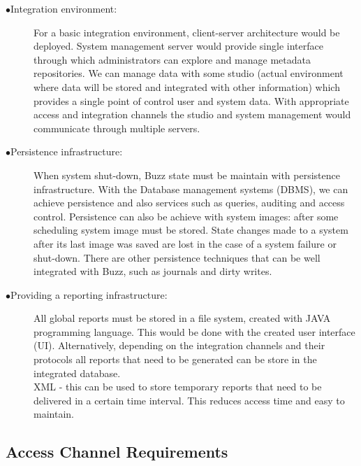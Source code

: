 \documentclass[hidelinks, 12pt]{article}
\begin{document}
\begin{description}
\item[$\bullet$Integration environment:]

For a basic integration environment, client-server architecture would be deployed. System management server would provide single interface through which administrators can explore and manage metadata repositories. We can manage data with some studio (actual environment where data will be stored and integrated with other information) which provides a single point of control user and system data. With appropriate access and integration channels the studio and system management would communicate through multiple servers.\\

\item[$\bullet$Persistence infrastructure:]

When system shut-down, Buzz state must be maintain with persistence infrastructure. With the Database management systems (DBMS), we can achieve persistence and also services such as queries, auditing and access control. Persistence can also be achieve with system images: after some scheduling system image must be stored. State changes made to a system after its last image was saved are lost in the case of a system failure or shut-down. There are other persistence techniques that can be well integrated with Buzz, such as journals and dirty writes.\\

\item[$\bullet$Providing a reporting infrastructure:]

All global reports must be stored in a file system, created with JAVA programming language. This would be done with the created user interface (UI). Alternatively, depending on the integration channels and their protocols all reports that need to be generated can be store in the integrated database.\\

XML - this can be used to store temporary reports that need to be delivered in a certain time interval. This reduces access time and easy to maintain.\\

\end{description}



\subsection{Access Channel Requirements}
\end{document}
